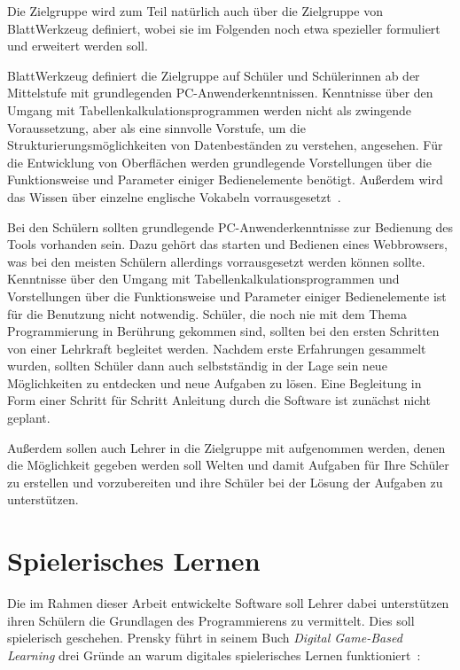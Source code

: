 Die Zielgruppe wird zum Teil natürlich auch über die Zielgruppe von BlattWerkzeug definiert, wobei sie im Folgenden noch etwa spezieller formuliert und erweitert werden soll.

BlattWerkzeug definiert die Zielgruppe auf Schüler und Schülerinnen ab der Mittelstufe mit grundlegenden PC-Anwenderkenntnissen. Kenntnisse über den Umgang mit Tabellenkalkulationsprogrammen werden nicht als zwingende Voraussetzung, aber als eine sinnvolle Vorstufe, um die Strukturierungsmöglichkeiten von Datenbeständen zu verstehen, angesehen. Für die Entwicklung von Oberflächen werden grundlegende Vorstellungen über die Funktionsweise und Parameter einiger Bedienelemente benötigt. Außerdem wird das Wissen über einzelne englische Vokabeln vorrausgesetzt~\cite[22-23]{riemer2016}.

Bei den Schülern sollten grundlegende PC-Anwenderkenntnisse zur Bedienung des Tools vorhanden sein. Dazu gehört das starten und Bedienen eines Webbrowsers, was bei den meisten Schülern allerdings vorrausgesetzt werden können sollte. Kenntnisse über den Umgang mit Tabellenkalkulationsprogrammen und Vorstellungen über die Funktionsweise und Parameter einiger Bedienelemente ist für die Benutzung nicht notwendig. Schüler, die noch nie mit dem Thema Programmierung in Berührung gekommen sind, sollten bei den ersten Schritten von einer Lehrkraft begleitet werden. Nachdem erste Erfahrungen gesammelt wurden, sollten Schüler dann auch selbstständig in der Lage sein neue Möglichkeiten zu entdecken und neue Aufgaben zu lösen. Eine Begleitung in Form einer Schritt für Schritt Anleitung durch die Software ist zunächst nicht geplant.

Außerdem sollen auch Lehrer in die Zielgruppe mit aufgenommen werden, denen die Möglichkeit gegeben werden soll Welten und damit Aufgaben für Ihre Schüler zu erstellen und vorzubereiten  und ihre Schüler bei der Lösung der Aufgaben zu unterstützen.


\section{Spielerisches Lernen}

Die im Rahmen dieser Arbeit entwickelte Software soll Lehrer dabei unterstützen ihren Schülern die Grundlagen des Programmierens zu vermittelt. Dies soll spielerisch geschehen. Prensky führt in seinem Buch \textit{Digital Game-Based Learning} drei Gründe an warum digitales spielerisches Lernen funktioniert~\cite[147]{prensky2007}:

